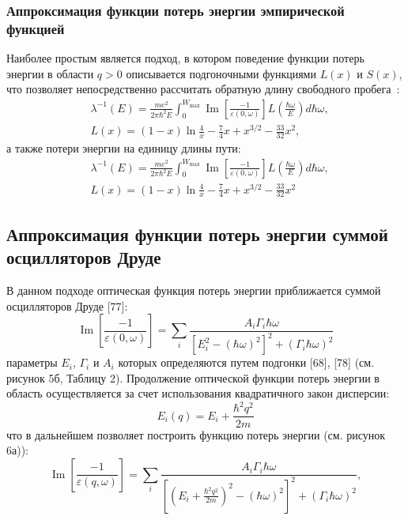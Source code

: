 \subsubsection{Аппроксимация функции потерь энергии эмпирической функцией}
Наиболее простым является подход, в котором поведение функции потерь энергии в области $q > 0$ описывается подгоночными функциями $L(x)$ и $S(x)$, что позволяет непосредственно рассчитать обратную длину свободного пробега~\cite{Ashley_LxSx}:
\begin{equation}
	\begin{aligned}
		&\lambda^{-1}(E)=\frac{m e^2}{2 \pi \hbar^2 E} \int_0^{W_{\max }} \operatorname{Im}\left[\frac{-1}{\varepsilon(0, \omega)}\right] L\left(\frac{\hbar \omega}{E}\right) d \hbar \omega, \\
		&L(x)=(1-x) \ln \frac{4}{x}-\frac{7}{4} x+x^{3 / 2}-\frac{33}{32} x^2,
	\end{aligned}
\end{equation}
а также потери энергии на единицу длины пути:
\begin{equation}
	\begin{aligned}
		&\lambda^{-1}(E)=\frac{m e^2}{2 \pi \hbar^2 E} \int_0^{W_{\max }} \operatorname{Im}\left[\frac{-1}{\varepsilon(0, \omega)}\right] L\left(\frac{\hbar \omega}{E}\right) d \hbar \omega, \\
		&L(x)=(1-x) \ln \frac{4}{x}-\frac{7}{4} x+x^{3 / 2}-\frac{33}{32} x^2
	\end{aligned}
\end{equation}


\subsection{Аппроксимация функции потерь энергии суммой осцилляторов Друде}
В данном подходе оптическая функция потерь энергии приближается суммой осцилляторов Друде [77]:
\begin{equation}
	\operatorname{Im}\left[\frac{-1}{\varepsilon(0, \omega)}\right]=\sum_i \frac{A_i \Gamma_i \hbar \omega}{\left[E_i^2-(\hbar \omega)^2\right]^2+\left(\Gamma_i \hbar \omega\right)^2}
\end{equation}
параметры $E_i$, $\Gamma_i$ и $A_i$ которых определяются путем подгонки [68], [78] (см. рисунок 5б, Таблицу 2). Продолжение оптической функции потерь энергии в область осуществляется за счет использования квадратичного закон дисперсии:
\begin{equation}
	E_i(q)=E_i+\frac{\hbar^2 q^2}{2 m}
\end{equation}
что в дальнейшем позволяет построить функцию потерь энергии (см. рисунок 6а)):
\begin{equation}
	\operatorname{Im}\left[\frac{-1}{\varepsilon(q, \omega)}\right]=\sum_i \frac{A_i \Gamma_i \hbar \omega}{\left[\left(E_i+\frac{\hbar^2 q^2}{2 m}\right)^2-(\hbar \omega)^2\right]^2+\left(\Gamma_i \hbar \omega\right)^2},
\end{equation}

